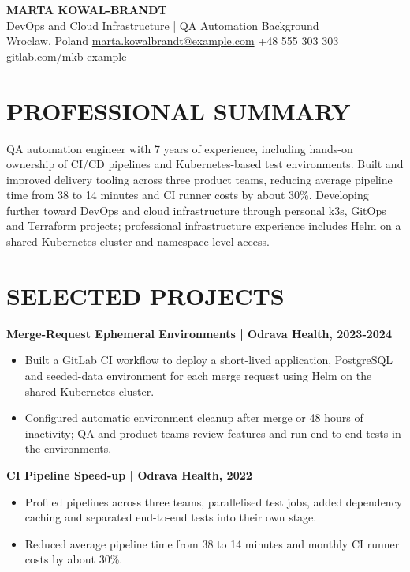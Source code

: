 \documentclass[11pt,a4paper]{article}
\begin{document}
\begin{center}
{\Huge\bfseries\color{primarycolor} MARTA KOWAL-BRANDT}\\[0.35em]
{\large\color{accentcolor} DevOps and Cloud Infrastructure | QA Automation Background}\\[0.3em]
Wroclaw, Poland \textbar{} \href{mailto:marta.kowalbrandt@example.com}{marta.kowalbrandt@example.com} \textbar{} +48 555 303 303 \textbar{} \href{https://gitlab.com/mkb-example}{gitlab.com/mkb-example}
\end{center}
\vspace{0.4em}

\section*{PROFESSIONAL SUMMARY}
QA automation engineer with 7 years of experience, including hands-on ownership of CI/CD pipelines and Kubernetes-based test environments. Built and improved delivery tooling across three product teams, reducing average pipeline time from 38 to 14 minutes and CI runner costs by about 30\%. Developing further toward DevOps and cloud infrastructure through personal k3s, GitOps and Terraform projects; professional infrastructure experience includes Helm on a shared Kubernetes cluster and namespace-level access.

\section*{SELECTED PROJECTS}
\textbf{Merge-Request Ephemeral Environments | Odrava Health, 2023-2024}
\begin{itemize}
\item Built a GitLab CI workflow to deploy a short-lived application, PostgreSQL and seeded-data environment for each merge request using Helm on the shared Kubernetes cluster.
\item Configured automatic environment cleanup after merge or 48 hours of inactivity; QA and product teams review features and run end-to-end tests in the environments.
\end{itemize}

\textbf{CI Pipeline Speed-up | Odrava Health, 2022}
\begin{itemize}
\item Profiled pipelines across three teams, parallelised test jobs, added dependency caching and separated end-to-end tests into their own stage.
\item Reduced average pipeline time from 38 to 14 minutes and monthly CI runner costs by about 30\%.
\end{itemize}
\end{document}

